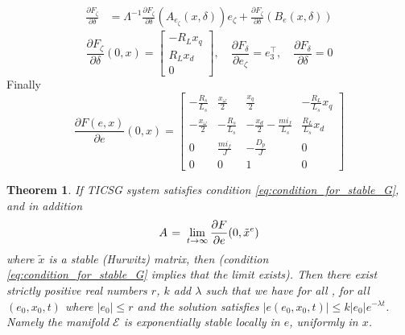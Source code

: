 \documentclass[letterpaper, 10 pt, conference]{ieeeconf}
\newtheorem{theorem}{Theorem}[section]
\renewcommand{\l}    {{\lambda}}
\newcommand{\m}      {{\hbox{\hskip 1pt}}}
\newcommand{\Emscr}  {{\mathcal{E}}}
\begin{document}
$$
\begin{aligned}
 \frac{\partial F_\zeta}{\partial \delta} & =  \varLambda^{-1} \frac{\partial F_\zeta}{\partial \delta}\left( A_{e_\zeta}(x,\delta) \right)e_\zeta+ \frac{\partial F_\zeta}{\partial \delta}\left(B_e(x,\delta)\right)
 \end{aligned}
$$
$$
 \frac{\partial F_\zeta}{\partial \delta}(0,x)  =  \left[\begin{array}{ccc}
 -R_L x_q\\
R_Lx_d\\
0
\end{array}\right],\quad \frac{\partial F_\delta}{\partial e_\zeta}=e_3^\top,\quad \frac{\partial F_\delta}{\partial \delta}
=0$$
Finally
\begin{equation}
\frac{\partial F(e,x)}{\partial e}(0,x)=\left[\begin{array}{cccc}
-\frac{R_{s}}{L_{s}} & \frac{x_{\omega}}{2} & \frac{x_{q}}{2} & -\frac{R_{L}}{L_{s}}x_{q}\\
-\frac{x_{\omega}}{2} & -\frac{R_{s}}{L_{s}} & -\frac{x_{d}}{2}-\frac{mi_f}{L_{s}} & \frac{R_{L}}{L_{s}}x_{d}\\
0 & \frac{mi_{f}}{J} & -\frac{D_{p}}{J} & 0\\
0 & 0 & 1 & 0
\end{array}\right]
\label{eq:AOft}
\end{equation}

\begin{theorem}\label{theorem:TICSGSync}
If TICSG system satisfies condition \eqref{eq:condition_for_stable_G},
and in addition
\begin{equation} \label{eq:eLinearizationLimit}
   A \m=\m \lim_{t\to\infty} \frac{\partial F}{\partial e}(0,
   \tilde{x}^e)
\end{equation}
where $\tilde{x}$ is a stable (Hurwitz) matrix, then (condition
\eqref{eq:condition_for_stable_G} implies that the limit exists). Then
there exist strictly positive real numbers $r$, $k$ add $\lambda$ such
that we have for all , for all $\left(e_0, x_0, t\right)$ where
$\left| e_0\right| \le r$ and the solution satisfies $\left| e\left(
e_0,x_0,t\right)\right|\leq k\left|e_0\right|e^{-\l t}$. Namely the 
manifold $\Emscr$ is exponentially stable locally in $e$, uniformly
in $x$.
\end{theorem}
 
\end{document}
